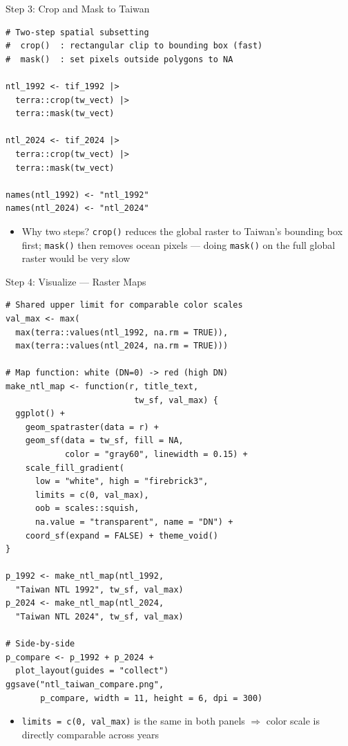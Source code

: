 \documentclass[dvipsnames,hyperref={pdfpagelabels=false}]{beamer}
\begin{document}
\begin{frame}[fragile]{Step 3: Crop and Mask to Taiwan}
\begin{lstlisting}
# Two-step spatial subsetting
#  crop()  : rectangular clip to bounding box (fast)
#  mask()  : set pixels outside polygons to NA

ntl_1992 <- tif_1992 |>
  terra::crop(tw_vect) |>
  terra::mask(tw_vect)

ntl_2024 <- tif_2024 |>
  terra::crop(tw_vect) |>
  terra::mask(tw_vect)

names(ntl_1992) <- "ntl_1992"
names(ntl_2024) <- "ntl_2024"
\end{lstlisting}
\begin{itemize}
  \item Why two steps? \texttt{crop()} reduces the global raster
        to Taiwan's bounding box first; \texttt{mask()} then removes
        ocean pixels --- doing \texttt{mask()} on the full global
        raster would be very slow
\end{itemize}
\end{frame}


\begin{frame}[fragile]{Step 4: Visualize --- Raster Maps}
\begin{lstlisting}
# Shared upper limit for comparable color scales
val_max <- max(
  max(terra::values(ntl_1992, na.rm = TRUE)),
  max(terra::values(ntl_2024, na.rm = TRUE)))

# Map function: white (DN=0) -> red (high DN)
make_ntl_map <- function(r, title_text,
                          tw_sf, val_max) {
  ggplot() +
    geom_spatraster(data = r) +
    geom_sf(data = tw_sf, fill = NA,
            color = "gray60", linewidth = 0.15) +
    scale_fill_gradient(
      low = "white", high = "firebrick3",
      limits = c(0, val_max),
      oob = scales::squish,
      na.value = "transparent", name = "DN") +
    coord_sf(expand = FALSE) + theme_void()
}

p_1992 <- make_ntl_map(ntl_1992,
  "Taiwan NTL 1992", tw_sf, val_max)
p_2024 <- make_ntl_map(ntl_2024,
  "Taiwan NTL 2024", tw_sf, val_max)

# Side-by-side
p_compare <- p_1992 + p_2024 +
  plot_layout(guides = "collect")
ggsave("ntl_taiwan_compare.png",
       p_compare, width = 11, height = 6, dpi = 300)
\end{lstlisting}
\begin{itemize}
  \item \texttt{limits = c(0, val\_max)} is the same in both panels
        $\Rightarrow$ color scale is directly comparable across years
\end{itemize}
\end{frame}
\end{document}
